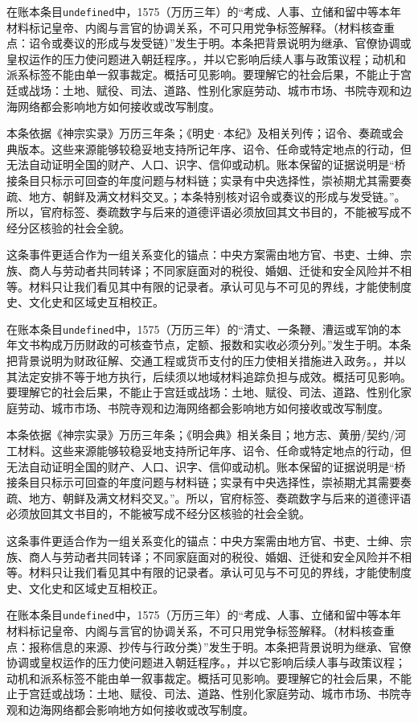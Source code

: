在账本条目\texttt{undefined}中，1575（万历三年）的“考成、人事、立储和留中等本年材料标记皇帝、内阁与言官的协调关系，不可只用党争标签解释。（材料核查重点：诏令或奏议的形成与发受链）”发生于明。本条把背景说明为继承、官僚协调或皇权运作的压力使问题进入朝廷程序。，并以它影响后续人事与政策议程；动机和派系标签不能由单一叙事裁定。概括可见影响。要理解它的社会后果，不能止于宫廷或战场：土地、赋役、司法、道路、性别化家庭劳动、城市市场、书院寺观和边海网络都会影响地方如何接收或改写制度。

本条依据《神宗实录》万历三年条；《明史·本纪》及相关列传；诏令、奏疏或会典版本。这些来源能够较稳妥地支持所记年序、诏令、任命或特定地点的行动，但无法自动证明全国的财产、人口、识字、信仰或动机。账本保留的证据说明是“桥接条目只标示可回查的年度问题与材料链；实录有中央选择性，崇祯期尤其需要奏疏、地方、朝鲜及满文材料交叉。；本条特别核对诏令或奏议的形成与发受链。”。所以，官府标签、奏疏数字与后来的道德评语必须放回其文书目的，不能被写成不经分区核验的社会全貌。

这条事件更适合作为一组关系变化的锚点：中央方案需由地方官、书吏、士绅、宗族、商人与劳动者共同转译；不同家庭面对的税役、婚姻、迁徙和安全风险并不相等。材料只让我们看见其中有限的记录者。承认可见与不可见的界线，才能使制度史、文化史和区域史互相校正。

在账本条目\texttt{undefined}中，1575（万历三年）的“清丈、一条鞭、漕运或军饷的本年文书构成万历财政的可核查节点，定额、报数和实收必须分列。”发生于明。本条把背景说明为财政征解、交通工程或货币支付的压力使相关措施进入政务。，并以其法定安排不等于地方执行，后续须以地域材料追踪负担与成效。概括可见影响。要理解它的社会后果，不能止于宫廷或战场：土地、赋役、司法、道路、性别化家庭劳动、城市市场、书院寺观和边海网络都会影响地方如何接收或改写制度。

本条依据《神宗实录》万历三年条；《明会典》相关条目；地方志、黄册/契约/河工材料。这些来源能够较稳妥地支持所记年序、诏令、任命或特定地点的行动，但无法自动证明全国的财产、人口、识字、信仰或动机。账本保留的证据说明是“桥接条目只标示可回查的年度问题与材料链；实录有中央选择性，崇祯期尤其需要奏疏、地方、朝鲜及满文材料交叉。”。所以，官府标签、奏疏数字与后来的道德评语必须放回其文书目的，不能被写成不经分区核验的社会全貌。

这条事件更适合作为一组关系变化的锚点：中央方案需由地方官、书吏、士绅、宗族、商人与劳动者共同转译；不同家庭面对的税役、婚姻、迁徙和安全风险并不相等。材料只让我们看见其中有限的记录者。承认可见与不可见的界线，才能使制度史、文化史和区域史互相校正。

在账本条目\texttt{undefined}中，1575（万历三年）的“考成、人事、立储和留中等本年材料标记皇帝、内阁与言官的协调关系，不可只用党争标签解释。（材料核查重点：报称信息的来源、抄传与行政分类）”发生于明。本条把背景说明为继承、官僚协调或皇权运作的压力使问题进入朝廷程序。，并以它影响后续人事与政策议程；动机和派系标签不能由单一叙事裁定。概括可见影响。要理解它的社会后果，不能止于宫廷或战场：土地、赋役、司法、道路、性别化家庭劳动、城市市场、书院寺观和边海网络都会影响地方如何接收或改写制度。

